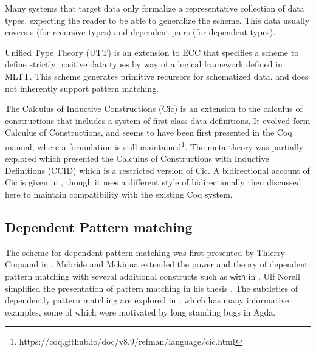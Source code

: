 Many systems that target data only formalize a representative collection of data types, expecting the reader to be able to generalize the scheme.
This data usually covers \Nat{}s (for recursive types) and dependent pairs (for dependent types). %


Unified Type Theory (\ac{UTT})\cite{luo1990extended,luo1994computation} is an extension to \ac{ECC} that specifies a scheme to define strictly positive data types by way of a logical framework defined in \ac{MLTT}.
This scheme generates primitive recursors for schematized data, and does not inherently support pattern matching.

The Calculus of Inductive Constructions (\ac{Cic}) is an extension to the calculus of constructions that includes a system of first class data definitions.
It evolved form Calculus of Constructions, and seems to have been first presented in the Coq manual, where a formulation is still maintained\footnote{https://coq.github.io/doc/v8.9/refman/language/cic.html}.
The meta theory was partially explored \cite{10.1007/BFb0037116} which presented the  Calculus of Constructions with Inductive Definitions (CCID) which is a restricted version of \ac{Cic}.
A bidirectional account of \ac{Cic} is given in \cite{lennonbertrand:LIPIcs.ITP.2021.24}, though it uses a different style of bidirectionally then discussed here to maintain compatibility with the existing Coq system.


\subsection{Dependent Pattern matching}


The scheme for dependent pattern matching was first presented by Thierry Coquand in \cite{coquand1992pattern}.
Mcbride and Mckinna extended the power and theory of dependent pattern matching with several additional constructs such as $\mathsf{with}$ in \cite{mcbride_mckinna_2004}.
Ulf Norell simplified the presentation of pattern matching in his thesis \cite{norell2007towards}.
The subtleties of dependently pattern matching are explored in \cite{cockx_devriese_2018}, which has many informative examples, some of which were motivated by long standing bugs in Agda.

